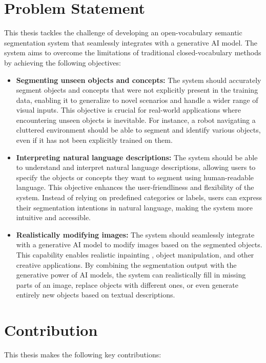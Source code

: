 \section{Problem Statement}

This thesis tackles the challenge of developing an open-vocabulary semantic segmentation system that seamlessly integrates with a generative AI model. The system aims to overcome the limitations of traditional closed-vocabulary methods by achieving the following objectives:

\begin{itemize}
\item \textbf{Segmenting unseen objects and concepts:} The system should accurately segment objects and concepts that were not explicitly present in the training data, enabling it to generalize to novel scenarios and handle a wider range of visual inputs. This objective is crucial for real-world applications where encountering unseen objects is inevitable. For instance, a robot navigating a cluttered environment should be able to segment and identify various objects, even if it has not been explicitly trained on them.
\item \textbf{Interpreting natural language descriptions:} The system should be able to understand and interpret natural language descriptions, allowing users to specify the objects or concepts they want to segment using human-readable language. This objective enhances the user-friendliness and flexibility of the system. Instead of relying on predefined categories or labels, users can express their segmentation intentions in natural language, making the system more intuitive and accessible.
\item \textbf{Realistically modifying images:} The system should seamlessly integrate with a generative AI model to modify images based on the segmented objects. This capability enables realistic inpainting \cite{yu2018generative}, object manipulation, and other creative applications. By combining the segmentation output with the generative power of AI models, the system can realistically fill in missing parts of an image, replace objects with different ones, or even generate entirely new objects based on textual descriptions.
\end{itemize}


\section{Contribution}

This thesis makes the following key contributions:

